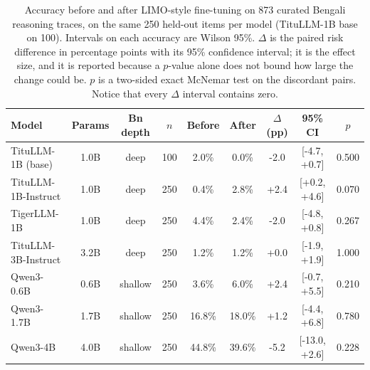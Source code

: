 \begin{table}[t]
\caption{Accuracy before and after LIMO-style fine-tuning on 873 curated
Bengali reasoning traces, on the same 250 held-out items per model
(TituLLM-1B base on 100). Intervals on each accuracy are Wilson 95\%.
$\Delta$ is the paired risk difference in percentage points with its 95\%
confidence interval; it is the effect size, and it is reported because a
$p$-value alone does not bound how large the change could be. $p$ is a
two-sided exact McNemar test on the discordant pairs. Notice that every
$\Delta$ interval contains zero.}
\label{tab:main}
\centering\small
\begin{tabular}{|l|c|c|c|c|c|c|c|c|}
\hline
\textbf{Model} & \textbf{Params} & \textbf{Bn depth} & \textbf{$n$} & \textbf{Before} & \textbf{After} & \textbf{$\Delta$ (pp)} & \textbf{95\% CI} & \textbf{$p$} \\
\hline
TituLLM-1B (base) & 1.0B & deep & 100 & 2.0\% & 0.0\% & -2.0 & [-4.7, +0.7] & 0.500 \\
TituLLM-1B-Instruct & 1.0B & deep & 250 & 0.4\% & 2.8\% & +2.4 & [+0.2, +4.6] & 0.070 \\
TigerLLM-1B & 1.0B & deep & 250 & 4.4\% & 2.4\% & -2.0 & [-4.8, +0.8] & 0.267 \\
TituLLM-3B-Instruct & 3.2B & deep & 250 & 1.2\% & 1.2\% & +0.0 & [-1.9, +1.9] & 1.000 \\
Qwen3-0.6B & 0.6B & shallow & 250 & 3.6\% & 6.0\% & +2.4 & [-0.7, +5.5] & 0.210 \\
Qwen3-1.7B & 1.7B & shallow & 250 & 16.8\% & 18.0\% & +1.2 & [-4.4, +6.8] & 0.780 \\
Qwen3-4B & 4.0B & shallow & 250 & 44.8\% & 39.6\% & -5.2 & [-13.0, +2.6] & 0.228 \\
\hline
\end{tabular}
\end{table}

